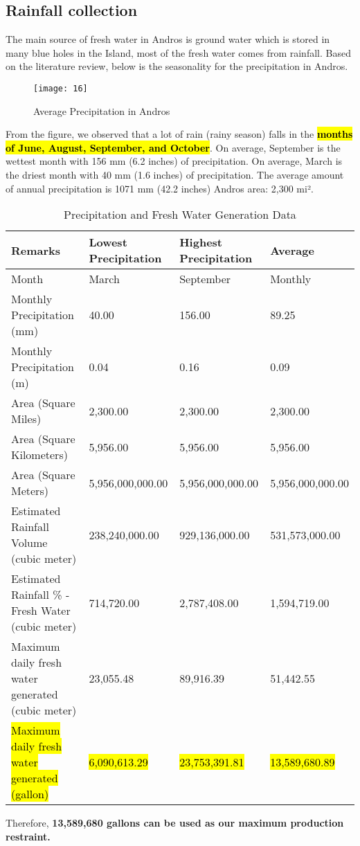 \documentclass{article}
\begin{document}
\subsection{Rainfall collection}
The main source of fresh water in Andros is ground water which is stored in many blue holes in the Island, most of the fresh water comes from rainfall. Based on the literature review, below is the seasonality for the precipitation in Andros.
\begin{figure}[H]
\centering
\texttt{[image: 16]}
\caption{Average Precipitation in Andros}
\label{fig:image1}
\end{figure}
From the figure, we observed that a lot of rain (rainy season) falls in the \hl{\textbf{months of June, August, September, and October}}. On average, September is the wettest month with 156 mm (6.2 inches) of precipitation. On average, March is the driest month with 40 mm (1.6 inches) of precipitation. The average amount of annual precipitation is 1071 mm (42.2 inches) Andros area: 2,300 mi².

\begin{table}[H]
\centering
\begin{tabular}{|p{4cm}|p{3cm}|p{3cm}|p{3cm}|}
\hline
\textbf{Remarks} & \textbf{Lowest Precipitation} & \textbf{Highest Precipitation} & \textbf{Average} \\
\hline
Month & March & September & Monthly \\
\hline
Monthly Precipitation (mm) & 40.00 & 156.00 & 89.25 \\
\hline
Monthly Precipitation (m) & 0.04 & 0.16 & 0.09 \\
\hline
Area (Square Miles) & 2,300.00 & 2,300.00 & 2,300.00 \\
\hline
Area (Square Kilometers) & 5,956.00 & 5,956.00 & 5,956.00 \\
\hline
Area (Square Meters) & 5,956,000,000.00 & 5,956,000,000.00 & 5,956,000,000.00 \\
\hline
Estimated Rainfall Volume (cubic meter) & 238,240,000.00 & 929,136,000.00 & 531,573,000.00 \\
\hline
Estimated Rainfall \% - Fresh Water (cubic meter) & 714,720.00 & 2,787,408.00 & 1,594,719.00 \\
\hline
Maximum daily fresh water generated (cubic meter) & 23,055.48 & 89,916.39 & 51,442.55 \\
\hline
\hl{Maximum daily fresh water generated (gallon)} & \hl{6,090,613.29} & \hl{23,753,391.81} & \hl{13,589,680.89} \\
\hline
\end{tabular}
\caption{Precipitation and Fresh Water Generation Data}
\end{table}
Therefore, \textbf{13,589,680 gallons can be used as our maximum production restraint.}
\end{document}
